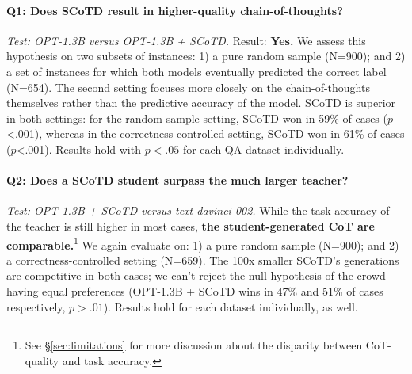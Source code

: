 \documentclass[11pt]{article}
\begin{document}
\paragraph{Q1: Does SCoTD result in higher-quality chain-of-thoughts?} \emph{Test: OPT-1.3B versus OPT-1.3B + SCoTD.} Result: \textbf{Yes.} We assess this hypothesis on two subsets of instances: 1) a pure random sample (N=900); and 2) a set of instances for which both models eventually predicted the correct label (N=654). The second setting focuses more closely on the chain-of-thoughts themselves rather than the predictive accuracy of the model. SCoTD is superior in both settings: for the random sample setting, SCoTD won in 59\% of cases ($p$<.001), whereas in the correctness controlled setting, SCoTD won in 61\% of cases ($p$<.001). Results hold with $p<.05$ for each QA dataset individually.

\paragraph{Q2: Does a SCoTD student surpass the much larger teacher?} \emph{Test: OPT-1.3B + SCoTD versus text-davinci-002.} While the task accuracy of the teacher is still higher in most cases, \textbf{the student-generated CoT are comparable.}\footnote{See \S\ref{sec:limitations} for more discussion about the disparity between CoT-quality and task accuracy.} We again evaluate on: 1) a pure random sample (N=900); and 2) a correctness-controlled setting (N=659). The 100x smaller SCoTD's generations are competitive in both cases; we can't reject the null hypothesis of the crowd having equal preferences (OPT-1.3B + SCoTD wins in 47\% and 51\% of cases respectively, $p > .01$). Results hold for each dataset individually, as well. 




\end{document}
